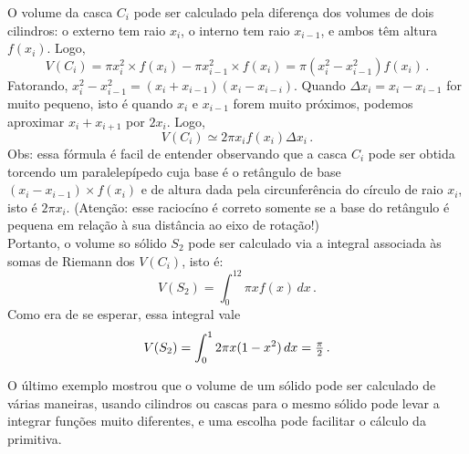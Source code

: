 \begin{ex}
\begin{center}
\begin{bmlimage}
\end{bmlimage}
\end{center}

O volume da casca $C_i$ pode ser calculado pela diferença dos
volumes de dois cilindros: o externo tem raio $x_i$, o
interno tem raio $x_{i-1}$, e ambos têm altura $f(x_i)$.
Logo, 
$$V(C_i)=\pi x_{i}^2\times f(x_i)-\pi x_{i-1}^2\times
f(x_i)=\pi(x_i^2-x_{i-1}^2)f(x_i)\,.$$
Fatorando,
$x_i^2-x_{i-1}^2=(x_i+x_{i-1})(x_i-x_{i-i})$. Quando 
$\Delta x_i=x_i-x_{i-1}$ for muito pequeno, isto é quando
$x_i$ e $x_{i-1}$ forem muito próximos, podemos
aproximar $x_i+x_{i+1}$ por $2x_i$. Logo, 
$$
V(C_i)\simeq 2\pi x_if(x_i)\Delta x_i\,.
$$
Obs: essa fórmula é facil de entender observando que a  
casca $C_i$ pode ser obtida torcendo um paralelepípedo
cuja base é o retângulo de base $(x_{i}-
x_{i-1})\times f(x_i)$ e de altura dada pela
circunferência do círculo de raio $x_i$, isto é $2\pi
x_i$. (Atenção: esse raciocíno é correto somente se a
base do retângulo é pequena em relação à sua distância ao
eixo de rotação!)\\

Portanto, o volume so sólido $S_2$ pode ser calculado via
a integral associada às somas de Riemann dos $V(C_i)$,
isto é:
$$
\boxed{
V(S_2)=\int_0^12\pi x f(x)\,dx\,.}
$$
Como era de se esperar, essa integral vale 
$$V(S_2)=\int_0^12\pi x(1-x^2)\,dx=\tfrac{\pi}{2}\,.$$
\end{ex}


O último exemplo mostrou que o volume de um sólido pode ser calculado de
várias maneiras, usando cilindros ou cascas para o mesmo sólido
pode levar a integrar funções muito diferentes, e uma escolha
pode facilitar o cálculo da primitiva.

